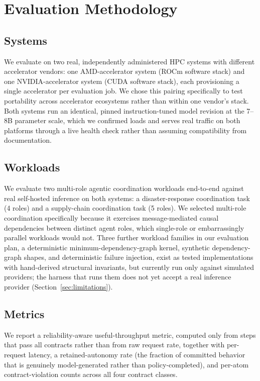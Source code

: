 \section{Evaluation Methodology}
\label{sec:methodology}

\subsection{Systems}
\label{sec:systems}

We evaluate on two real, independently administered HPC systems with different accelerator vendors: one AMD-accelerator system (ROCm software stack) and one NVIDIA-accelerator system (CUDA software stack), each provisioning a single accelerator per evaluation job. We chose this pairing specifically to test portability across accelerator ecosystems rather than within one vendor's stack. Both systems run an identical, pinned instruction-tuned model revision at the 7--8B parameter scale, which we confirmed loads and serves real traffic on both platforms through a live health check rather than assuming compatibility from documentation.

\subsection{Workloads}
\label{sec:workloads}

We evaluate two multi-role agentic coordination workloads end-to-end against real self-hosted inference on both systems: a disaster-response coordination task (4 roles) and a supply-chain coordination task (5 roles). We selected multi-role coordination specifically because it exercises message-mediated causal dependencies between distinct agent roles, which single-role or embarrassingly parallel workloads would not. Three further workload families in our evaluation plan, a deterministic minimum-dependency-graph kernel, synthetic dependency-graph shapes, and deterministic failure injection, exist as tested implementations with hand-derived structural invariants, but currently run only against simulated providers; the harness that runs them does not yet accept a real inference provider (Section~\ref{sec:limitations}).

\subsection{Metrics}
\label{sec:metrics}

We report a reliability-aware useful-throughput metric, computed only from steps that pass all contracts rather than from raw request rate, together with per-request latency, a retained-autonomy rate (the fraction of committed behavior that is genuinely model-generated rather than policy-completed), and per-atom contract-violation counts across all four contract classes.


